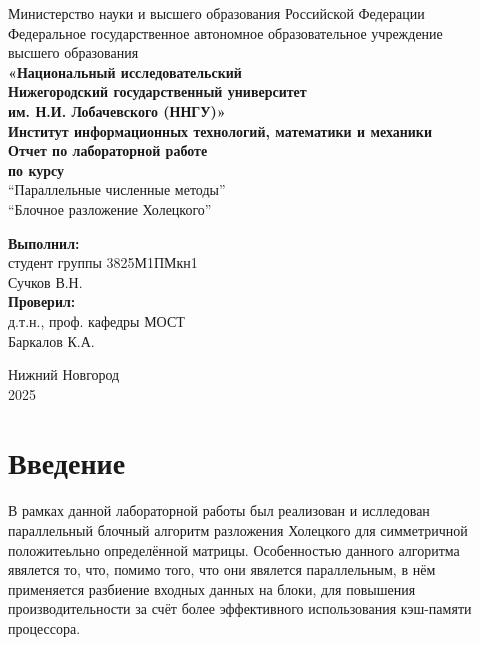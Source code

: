 \documentclass[11pt, a4paper]{article}
\def\newsection#1{
    \section{#1}
}
\begin{document}
\begin{center}
Министерство науки и высшего образования Российской Федерации \\
Федеральное государственное автономное образовательное учреждение \\
высшего образования\\ 
\textbf{«Национальный исследовательский \\ Нижегородский государственный университет \\
им. Н.И. Лобачевского (ННГУ)»}\\[1.5cm]
\textbf{Институт информационных технологий, математики и механики }\\[5.5cm]

\textbf{Отчет по лабораторной работе} \\
\textbf{по курсу}  \\
``Параллельные численные методы'' \\
``Блочное разложение Холецкого'' \\ [5cm]


\begin{flushright}
\begin{minipage}{0.52\textwidth}
\begin{flushleft}
\textbf{Выполнил:} \\
студент группы 3825М1ПМкн1 \\
Сучков В.Н.\\[0.3cm]
\textbf{Проверил:}\\
д.т.н., проф. кафедры МОСТ\\  Баркалов К.А.\\[0.3cm]
\end{flushleft}
\end{minipage}
\end{flushright}

\vfill

Нижний Новгород \\
2025

\thispagestyle{empty}
\end{center}

\newpage
\tableofcontents
\thispagestyle{empty}
\newpage
\newsection{Введение}
\setcounter{page}{1}
В рамках данной лабораторной работы был реализован и ислледован параллельный блочный алгоритм разложения Холецкого для
симметричной положитеьльно определённой матрицы. Особенностью данного алгоритма явялется то, что, помимо того, что они явялется
параллельным, в нём применяется разбиение входных данных на блоки, для повышения производительности за счёт более эффективного
использования кэш-памяти процессора.
\end{document}
